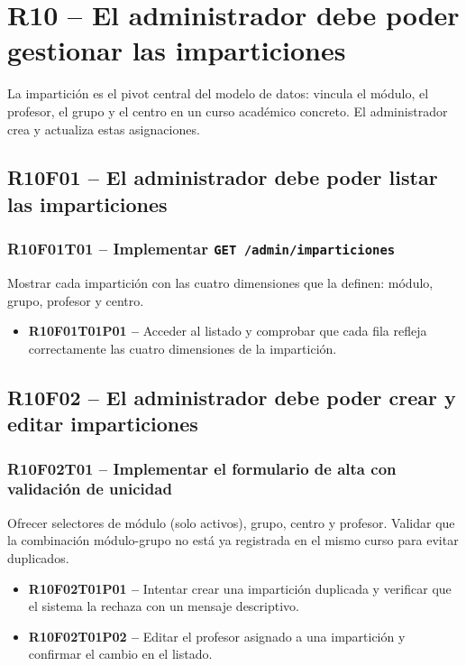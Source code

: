 \documentclass[12pt, a4paper]{report}
\begin{document}
\section{R10 -- El administrador debe poder gestionar las imparticiones}

La impartición es el pivot central del modelo de datos: vincula el módulo, el profesor, el grupo y el centro en un curso académico concreto. El administrador crea y actualiza estas asignaciones.

\subsection{R10F01 -- El administrador debe poder listar las imparticiones}

\subsubsection{R10F01T01 -- Implementar \texttt{GET /admin/imparticiones}}
Mostrar cada impartición con las cuatro dimensiones que la definen: módulo, grupo, profesor y centro.
\begin{itemize}
  \item \textbf{R10F01T01P01 --} Acceder al listado y comprobar que cada fila refleja correctamente las cuatro dimensiones de la impartición.
\end{itemize}

\subsection{R10F02 -- El administrador debe poder crear y editar imparticiones}

\subsubsection{R10F02T01 -- Implementar el formulario de alta con validación de unicidad}
Ofrecer selectores de módulo (solo activos), grupo, centro y profesor. Validar que la combinación módulo-grupo no está ya registrada en el mismo curso para evitar duplicados.
\begin{itemize}
  \item \textbf{R10F02T01P01 --} Intentar crear una impartición duplicada y verificar que el sistema la rechaza con un mensaje descriptivo.
  \item \textbf{R10F02T01P02 --} Editar el profesor asignado a una impartición y confirmar el cambio en el listado.
\end{itemize}
\end{document}
